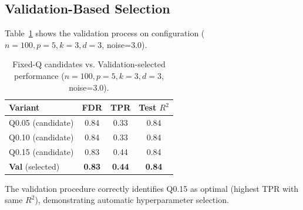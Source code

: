 \subsection{Validation-Based Selection}
\label{subsec:validation}

Table~\ref{tab:fixed-q} shows the validation process on configuration ($n=100, p=5, k=3, d=3$, noise=3.0).

\begin{table}[htbp]
\centering
\caption{Fixed-Q candidates vs. Validation-selected performance ($n=100, p=5, k=3, d=3$, noise=3.0).}
\label{tab:fixed-q}
\small
\begin{tabular}{lccc}
\toprule
\textbf{Variant} & \textbf{FDR} & \textbf{TPR} & \textbf{Test $R^2$} \\
\midrule
Q0.05 (candidate) & 0.84 & 0.33 & 0.84 \\
Q0.10 (candidate) & 0.84 & 0.33 & 0.84 \\
Q0.15 (candidate) & 0.83 & 0.44 & 0.84 \\
\midrule
\textbf{Val} (selected) & \textbf{0.83} & \textbf{0.44} & \textbf{0.84} \\
\bottomrule
\end{tabular}
\end{table}

The validation procedure correctly identifies Q0.15 as optimal (highest TPR with same $R^2$), demonstrating automatic hyperparameter selection.
